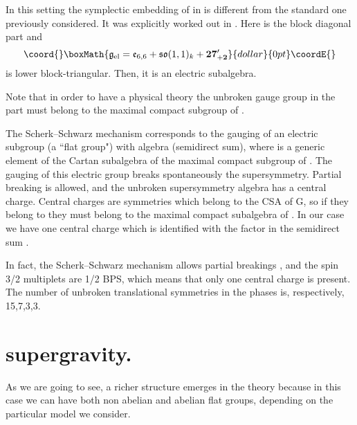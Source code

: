 \documentclass[a4paper,12pt]{article}
\begin{document}
In this setting the symplectic embedding of \coordHE{} in
\coordHE{} is different from the standard one previously
considered. It was explicitly worked out in \cite{adfl2}. Here
\coordHE{} is the block diagonal part and
$$\coord{}\boxMath{\fg_{\mathrm{el}} = \fe_{6,6}+\fso(1,1)_{k} +\mathbf{27'_{+2}}}{dollar}{0pt}\coordE{}$$
is lower block-triangular. Then, it is an electric subalgebra.
\par
Note that in order to have a physical theory the unbroken gauge
group in the \coordHE{} part must belong to the maximal compact
subgroup of \coordHE{}.



The Scherk--Schwarz \cite{ss,css} mechanism corresponds to the
gauging of an electric subgroup (a ``flat group") with algebra
\coordHE{} (semidirect
sum), where
 \coordHE{} is a generic element of the Cartan
subalgebra of the maximal compact subgroup \coordHE{} of
\coordHE{} \cite{adfl2}. The gauging of this electric group
breaks spontaneously the supersymmetry. Partial breaking is
allowed, and the unbroken supersymmetry algebra has a central
charge.  Central charges are \coordHE{} symmetries which belong to
the CSA of G, so if they belong to \coordHE{} they must
belong to  the maximal compact subalgebra of \coordHE{}. In our case we have one central charge which
is identified with the \coordHE{} factor in the semidirect sum
\coordHE{}.

In fact, the Scherk--Schwarz mechanism allows partial breakings
\coordHE{}, and the spin 3/2 multiplets are 1/2
BPS, which means that only one central charge is present. The
number of unbroken translational symmetries in the phases
\coordHE{} is, respectively, 15,7,3,3.


\section{\coordHE{} supergravity. \label{N=4}}

 As we are going to see, a richer structure emerges in the \coordHE{} theory
 because in this case
we can have both non abelian and abelian flat groups, depending on
the particular model we consider.
\end{document}
